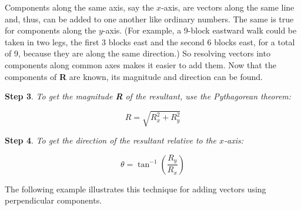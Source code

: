 \documentclass[../../main-ap-physics.tex]{subfiles}
\begin{document}
\begin{center}
    \captionsetup{type=figure,margin=1in,font=scriptsize}
    \label{QVly9l}
\end{center}

Components along the same axis, say the $x$-axis, are vectors along the same line and, thus, can be added to one another like ordinary numbers. The same is true for components along the $y$-axis. (For example, a 9-block eastward walk could be taken in two legs, the first 3 blocks east and the second 6 blocks east, for a total of 9, because they are along the same direction.) So resolving vectors into components along common axes makes it easier to add them. Now that the components of \textbf{R} are known, its magnitude and direction can be found.

\vspace{1em}

\textbf{Step 3}. \textit{To get the magnitude \textbf{R} of the resultant, use the Pythagorean theorem:}

\begin{equation}
    R = \sqrt{R_x^2 + R_y^2}
\end{equation}

\textbf{Step 4}. \textit{To get the direction of the resultant relative to the $x$-axis:}

\begin{equation}
    \theta = \tan^{-1}\left(\frac{R_y}{R_x}\right)
\end{equation}

The following example illustrates this technique for adding vectors using perpendicular components.
\end{document}
